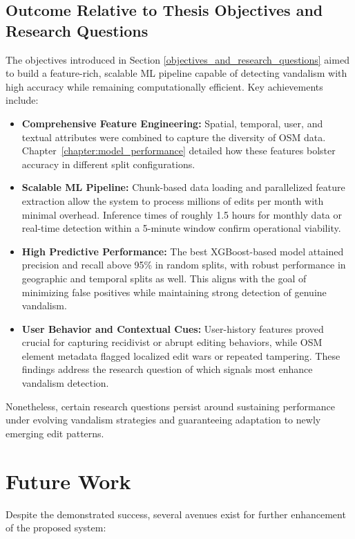 \documentclass[
    13pt, %
    a4paper, %
    listof=totoc, %
    bibliography=totoc, %
    index=totoc, %
    headsepline
]{scrreprt}
\begin{document}
\subsection{Outcome Relative to Thesis Objectives and Research Questions}
The objectives introduced in Section \ref{objectives_and_research_questions} aimed to build a feature-rich, scalable ML pipeline capable of detecting vandalism with high accuracy while remaining computationally efficient. Key achievements include:
\begin{itemize}
    \item \textbf{Comprehensive Feature Engineering:} Spatial, temporal, user, and textual attributes were combined to capture the diversity of OSM data. Chapter~\ref{chapter:model_performance} detailed how these features bolster accuracy in different split configurations.
    \item \textbf{Scalable ML Pipeline:} Chunk-based data loading and parallelized feature extraction allow the system to process millions of edits per month with minimal overhead. Inference times of roughly 1.5 hours for monthly data or real-time detection within a 5-minute window confirm operational viability.
    \item \textbf{High Predictive Performance:} The best XGBoost-based model attained precision and recall above 95\% in random splits, with robust performance in geographic and temporal splits as well. This aligns with the goal of minimizing false positives while maintaining strong detection of genuine vandalism.
    \item \textbf{User Behavior and Contextual Cues:} User-history features proved crucial for capturing recidivist or abrupt editing behaviors, while OSM element metadata flagged localized edit wars or repeated tampering. These findings address the research question of which signals most enhance vandalism detection.
\end{itemize}
Nonetheless, certain research questions persist around sustaining performance under evolving vandalism strategies and guaranteeing adaptation to newly emerging edit patterns.

\section{Future Work}
\label{sec:future_work}

Despite the demonstrated success, several avenues exist for further enhancement of the proposed system:
\end{document}
